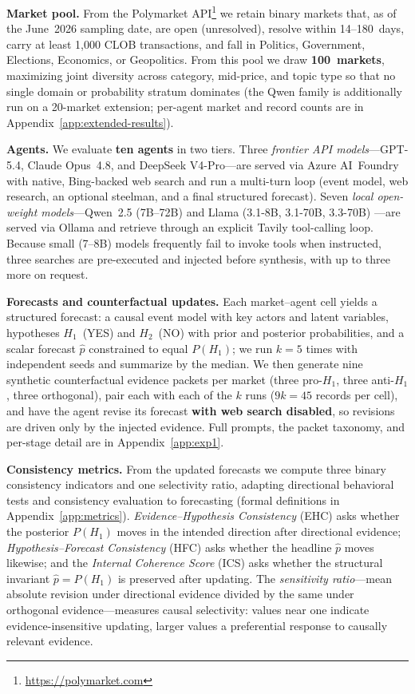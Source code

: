 \textbf{Market pool.}  From the Polymarket API\footnote{\url{https://polymarket.com}} we
retain binary markets that, as of the June~2026 sampling date, are open (unresolved),
resolve within 14--180~days, carry at least 1{,}000 CLOB transactions, and fall in
Politics, Government, Elections, Economics, or Geopolitics.  From this pool we draw
\textbf{100~markets}, maximizing joint diversity across category, mid-price, and topic type
so that no single domain or probability stratum dominates (the Qwen family is additionally
run on a 20-market extension; per-agent market and record counts are in
Appendix~\ref{app:extended-results}).

\textbf{Agents.}  We evaluate \textbf{ten agents} in two tiers.  Three \emph{frontier API
models}---GPT-5.4, Claude Opus~4.8, and DeepSeek V4-Pro---are served via Azure AI~Foundry
with native, Bing-backed web search and run a multi-turn loop (event model, web research,
an optional steelman, and a final structured forecast).  Seven \emph{local open-weight
models}---Qwen~2.5 (7B--72B) \citep{qwen2025qwen25} and Llama (3.1-8B, 3.1-70B, 3.3-70B)
\citep{grattafiori2024llama}---are served via Ollama and retrieve through an explicit
Tavily tool-calling loop.  Because small (7--8B) models frequently fail to invoke tools
when instructed, three searches are pre-executed and injected before synthesis, with up to
three more on request.

\textbf{Forecasts and counterfactual updates.}  Each market--agent cell yields a structured
forecast: a causal event model with key actors and latent variables, hypotheses $H_1$~(YES)
and $H_2$~(NO) with prior and posterior probabilities, and a scalar forecast $\hat{p}$
constrained to equal $P(H_1)$; we run $k=5$ times with independent seeds and summarize by
the median.  We then generate nine synthetic counterfactual evidence packets per market
(three pro-$H_1$, three anti-$H_1$, three orthogonal), pair each with each of the $k$ runs
($9k=45$ records per cell), and have the agent revise its forecast \textbf{with web search
disabled}, so revisions are driven only by the injected evidence.  Full prompts, the packet
taxonomy, and per-stage detail are in Appendix~\ref{app:exp1}.

\textbf{Consistency metrics.}  From the updated forecasts we compute three binary
consistency indicators and one selectivity ratio, adapting directional behavioral tests
\citep{ribeiro2020beyond} and consistency evaluation \citep{elazar2021measuring} to
forecasting (formal definitions in Appendix~\ref{app:metrics}).
\emph{Evidence--Hypothesis Consistency} (EHC) asks whether the posterior $P(H_1)$ moves in
the intended direction after directional evidence; \emph{Hypothesis--Forecast Consistency}
(HFC) asks whether the headline $\hat{p}$ moves likewise; and the \emph{Internal Coherence
Score} (ICS) asks whether the structural invariant $\hat{p}=P(H_1)$ is preserved after
updating.  The \emph{sensitivity ratio}---mean absolute revision under directional evidence
divided by the same under orthogonal evidence---measures causal selectivity: values near
one indicate evidence-insensitive updating, larger values a preferential response to
causally relevant evidence.

